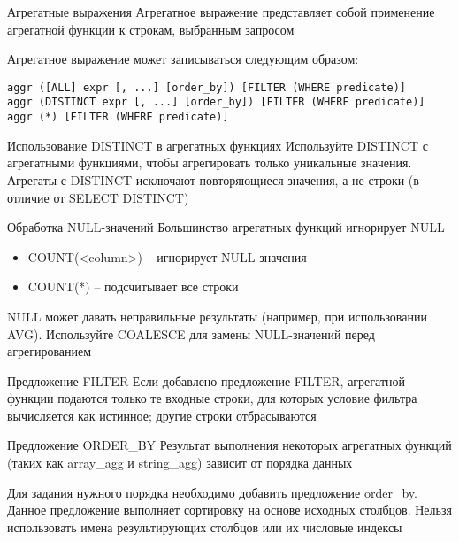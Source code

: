 \documentclass[12pt]{article}
\begin{document}
\begin{defin}{Агрегатные выражения}
    Агрегатное выражение представляет собой применение агрегатной функции к строкам, выбранным запросом 

    Агрегатное выражение может записываться следующим образом:

\begin{lstlisting}
aggr ([ALL] expr [, ...] [order_by]) [FILTER (WHERE predicate)]
aggr (DISTINCT expr [, ...] [order_by]) [FILTER (WHERE predicate)]
aggr (*) [FILTER (WHERE predicate)]
\end{lstlisting}
\end{defin}

\begin{nota}{Использование DISTINCT в агрегатных функциях}
    Используйте DISTINCT с агрегатными функциями, чтобы агрегировать только уникальные значения. Агрегаты с DISTINCT исключают повторяющиеся значения, а не строки (в отличие от SELECT DISTINCT)
\end{nota}

\begin{nota}{Обработка NULL-значений}
    Большинство агрегатных функций игнорирует NULL

    \begin{itemize}
        \item COUNT(<column>) -- игнорирует NULL-значения
        \item COUNT(*) -- подсчитывает все строки 
    \end{itemize}

    NULL может давать неправильные результаты (например, при использовании AVG). Используйте COALESCE для замены NULL-значений перед агрегированием
\end{nota}

\begin{defin}{Предложение FILTER}
    Если добавлено предложение FILTER, агрегатной функции подаются только те входные строки, для которых условие фильтра вычисляется как истинное; другие строки отбрасываются
\end{defin}

\begin{defin}{Предложение ORDER\_BY}
    Результат выполнения некоторых агрегатных функций (таких как array\_agg и string\_agg) зависит от порядка данных 

    Для задания нужного порядка необходимо добавить предложение order\_by. Данное предложение выполняет сортировку на основе исходных столбцов. Нельзя использовать имена результирующих столбцов или их числовые индексы 
\end{defin}
\end{document}
